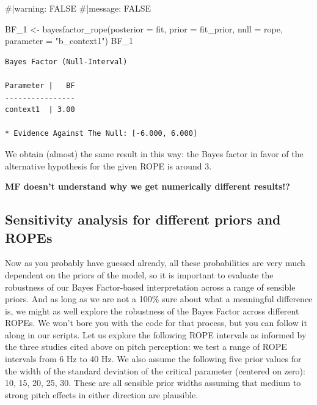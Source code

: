 \documentclass[
  doc,
  floatsintext,
  longtable,
  nolmodern,
  notxfonts,
  notimes,
  colorlinks=true,linkcolor=blue,citecolor=blue,urlcolor=blue]{apa7}
\newenvironment{Shaded}{\begin{snugshade}}{\end{snugshade}}
\newcommand{\AttributeTok}[1]{\textcolor[rgb]{0.40,0.45,0.13}{#1}}
\newcommand{\CommentTok}[1]{\textcolor[rgb]{0.37,0.37,0.37}{#1}}
\newcommand{\FunctionTok}[1]{\textcolor[rgb]{0.28,0.35,0.67}{#1}}
\newcommand{\NormalTok}[1]{\textcolor[rgb]{0.00,0.23,0.31}{#1}}
\newcommand{\OtherTok}[1]{\textcolor[rgb]{0.00,0.23,0.31}{#1}}
\newcommand{\StringTok}[1]{\textcolor[rgb]{0.13,0.47,0.30}{#1}}
\begin{document}
\begin{Shaded}
\begin{Highlighting}[]
\CommentTok{\#|warning: FALSE}
\CommentTok{\#|message: FALSE}

\NormalTok{BF\_1 }\OtherTok{\textless{}{-}} \FunctionTok{bayesfactor\_rope}\NormalTok{(}\AttributeTok{posterior =}\NormalTok{ fit, }
                         \AttributeTok{prior =}\NormalTok{ fit\_prior,}
                         \AttributeTok{null =}\NormalTok{ rope, }
                         \AttributeTok{parameter =} \StringTok{"b\_context1"}\NormalTok{)}
\NormalTok{BF\_1}
\end{Highlighting}
\end{Shaded}

\begin{verbatim}
Bayes Factor (Null-Interval)

Parameter |   BF
----------------
context1  | 3.00

* Evidence Against The Null: [-6.000, 6.000]
\end{verbatim}

We obtain (almost) the same result in this way: the Bayes factor in
favor of the alternative hypothesis for the given ROPE is around 3.

\textbf{MF doesn't understand why we get numerically different
results!?}

\subsection{Sensitivity analysis for different priors and
ROPEs}\label{sensitivity-analysis-for-different-priors-and-ropes}

Now as you probably have guessed already, all these probabilities are
very much dependent on the priors of the model, so it is important to
evaluate the robustness of our Bayes Factor-based interpretation across
a range of sensible priors. And as long as we are not a 100\% sure about
what a meaningful difference is, we might as well explore the robustness
of the Bayes Factor across different ROPEs. We won't bore you with the
code for that process, but you can follow it along in our scripts. Let
us explore the following ROPE intervals as informed by the three studies
cited above on pitch perception: we test a range of ROPE intervals from
6 Hz to 40 Hz. We also assume the following five prior values for the
width of the standard deviation of the critical parameter (centered on
zero): 10, 15, 20, 25, 30. These are all sensible prior widths assuming
that medium to strong pitch effects in either direction are plausible.
\end{document}
